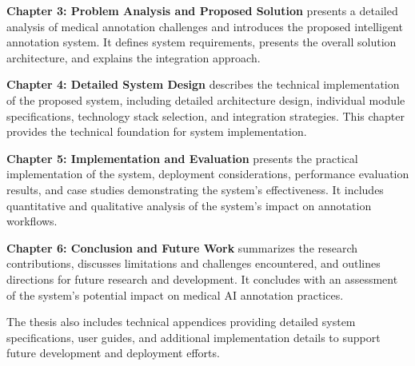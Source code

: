 \textbf{Chapter 3: Problem Analysis and Proposed Solution} presents a detailed analysis of medical annotation challenges and introduces the proposed intelligent annotation system. It defines system requirements, presents the overall solution architecture, and explains the integration approach.

\textbf{Chapter 4: Detailed System Design} describes the technical implementation of the proposed system, including detailed architecture design, individual module specifications, technology stack selection, and integration strategies. This chapter provides the technical foundation for system implementation.

\textbf{Chapter 5: Implementation and Evaluation} presents the practical implementation of the system, deployment considerations, performance evaluation results, and case studies demonstrating the system's effectiveness. It includes quantitative and qualitative analysis of the system's impact on annotation workflows.

\textbf{Chapter 6: Conclusion and Future Work} summarizes the research contributions, discusses limitations and challenges encountered, and outlines directions for future research and development. It concludes with an assessment of the system's potential impact on medical AI annotation practices.

The thesis also includes technical appendices providing detailed system specifications, user guides, and additional implementation details to support future development and deployment efforts. 
